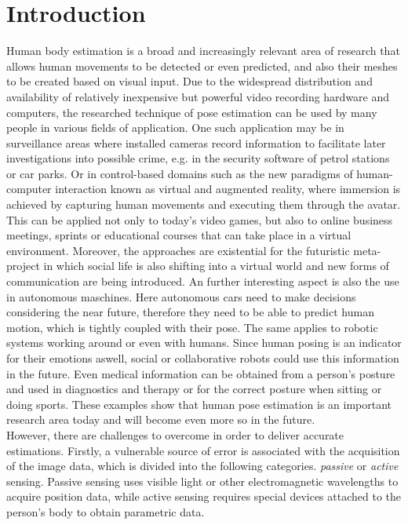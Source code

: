 \section{Introduction}
Human body estimation is a broad and increasingly relevant area of research that allows human movements to be detected or even predicted, and also their meshes to be created based on visual input. Due to the widespread distribution and availability of relatively inexpensive but powerful video recording hardware and computers, the researched technique of pose estimation can be used by many people in various fields of application. One such application may be in surveillance areas where installed cameras record information to facilitate later investigations into possible crime, e.g. in the security software of petrol stations or car parks. Or in control-based domains such as the new paradigms of human-computer interaction known as virtual and augmented reality, where immersion is achieved by capturing human movements and executing them through the avatar. This can be applied not only to today's video games, but also to online business meetings, sprints or educational courses that can take place in a virtual environment. Moreover, the approaches are existential for the futuristic meta-project in which social life is also shifting into a virtual world and new forms of communication are being introduced. An further interesting aspect is also the use in autonomous maschines. Here autonomous cars need to make decisions considering the near future, therefore they need to be able to predict human motion, which is tightly coupled with their pose. The same applies to robotic systems working around or even with humans. Since human posing is an indicator for their emotions aswell, social or collaborative robots could use this information in the future. Even medical information can be obtained from a person's posture and used in diagnostics and therapy or for the correct posture when sitting or doing sports. These examples show that human pose estimation is an important research area today and will become even more so in the future. 
\\
However, there are challenges to overcome in order to deliver accurate estimations. Firstly, a vulnerable source of error is associated with the acquisition of the image data, which is divided into the following categories. \emph{passive} or \emph{active} sensing. Passive sensing uses visible light or other electromagnetic wavelengths to acquire position data, while active sensing requires special devices attached to the person's body to obtain parametric data.
